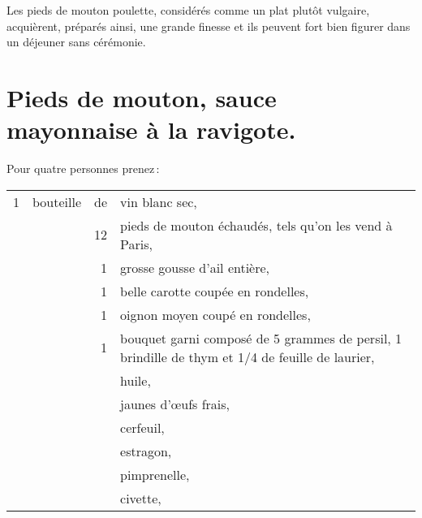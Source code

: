 Les pieds de mouton poulette, considérés comme un plat plutôt vulgaire,
acquièrent, préparés ainsi, une grande finesse et ils peuvent fort bien figurer
dans un déjeuner sans cérémonie.

\section*{\centering Pieds de mouton, sauce mayonnaise à la ravigote.}
{}

Pour quatre personnes prenez :

\medskip

\footnotesize
\begin{longtable}{rrrp{18em}}
      1 & bouteille & de & vin blanc sec,                                                                 \\
        &           & 12 & pieds de mouton échaudés, tels qu'on les vend à Paris,                         \\
        &           &  1 & grosse gousse d'ail entière,                                                   \\
        &           &  1 & belle carotte coupée en rondelles,                                             \\
        &           &  1 & oignon moyen coupé en rondelles,                                               \\
        &           &  1 & bouquet garni composé de 5 grammes de persil,
                           1 brindille de thym et 1/4 de feuille de laurier,                              \\
        &           &    & huile,                                                                         \\
        &           &    & jaunes d'œufs frais,                                                           \\
        &           &    & cerfeuil,                                                                      \\
        &           &    & estragon,                                                                      \\
        &           &    & pimprenelle,                                                                   \\
        &           &    & civette,                                                                       \\

\end{longtable}

